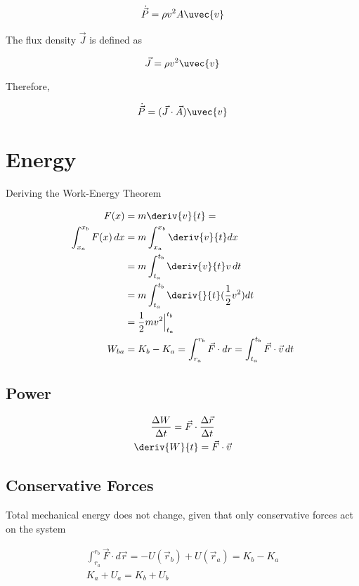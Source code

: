 \documentclass{notes}
\begin{document}
\begin{gather}
    \dot{\vec{P}} = \rho v^2 A \uvec{v}
\end{gather}

The flux density \(\vec{J}\) is defined as

\[\vec{J} = \rho v^2 \uvec{v}\]

Therefore,

\[\dot{\vec{P}} = (\vec{J} \cdot \vec{A})\uvec{v}\]

\section{Energy}

Deriving the Work-Energy Theorem

\begin{align}
    F(x) &= m\deriv{v}{t} =\\
    \int_{x_a}^{x_b} F(x)\,dx &= m\int_{x_a}^{x_b}\deriv{v}{t}dx\\
    &= m \int_{t_a}^{t_b}\deriv{v}{t}v\,dt\\
    &= m \int_{t_a}^{t_b}\deriv{}{t}(\frac{1}{2}v^2)dt\\
    &= \frac{1}{2}mv^2 \Big|_{t_a}^{t_b}\\
    W_{ba} &= K_b - K_a = \int_{r_a}^{r_b} \vec{F}\cdot dr = \int_{t_a}^{t_b} \vec{F}\cdot \vec{v} \, dt
\end{align}

\subsection{Power}

\begin{gather}
    \frac{\Delta W}{\Delta t} = \vec{F} \cdot \frac{\Delta \vec{r}}{\Delta t}\\
    \deriv{W}{t} = \vec{F} \cdot \vec{v} 
\end{gather}

\subsection{Conservative Forces}

Total mechanical energy does not change, given that only conservative forces act on the system

\begin{gather}
    \int_{r_a}^{r_b}\vec{F}\cdot d\vec{r} = -U(\vec{r}_b)+ U(\vec{r}_a) = K_b - K_a\\
    K_a + U_a = K_b + U_b
\end{gather}
\end{document}
